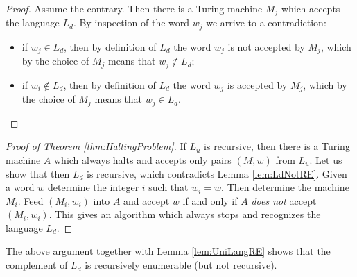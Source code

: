 \begin{page}
\setcounter{section}{8}
\setcounter{subsection}{5}
\setcounter{dfn}{9}
\label{portion:1209}

\begin{proof}
Assume the contrary.
Then there is a Turing machine $M_j$ which accepts the language $L_d$.
By inspection of the word $w_j$ we arrive to a contradiction:
\begin{itemize}
\item
if $w_j \in L_d$, then by definition of $L_d$ the word $w_j$ is not accepted by $M_j$, which by the choice of $M_j$ means that $w_j \notin L_d$;
\item
if $w_i \notin L_d$, then by definition of $L_d$ the word $w_j$ is accepted by $M_j$, which by the choice of $M_j$ means that $w_j \in L_d$.
\end{itemize}
\end{proof}


\begin{proof}[Proof of Theorem \ref{thm:HaltingProblem}]
If $L_u$ is recursive, then there is a Turing machine $A$ which always halts and accepts only pairs $(M, w)$ from $L_u$.
Let us show that then $L_d$ is recursive, which contradicts Lemma \ref{lem:LdNotRE}.
Given a word $w$ determine the integer $i$ such that $w_i = w$.
Then determine the machine $M_i$.
Feed $(M_i, w_i)$ into $A$ and accept $w$ if and only if $A$ \emph{does not} accept $(M_i,w_i)$.
This gives an algorithm which always stops and recognizes the language $L_d$.
\end{proof}


\end{page}

\begin{page}
\setcounter{section}{8}
\setcounter{subsection}{5}
\setcounter{dfn}{10}
\label{portion:1211}

\begin{rem}
The above argument together with Lemma \ref{lem:UniLangRE} shows that
the complement of $L_d$ is recursively enumerable (but not recursive).
\end{rem}

\end{page}

